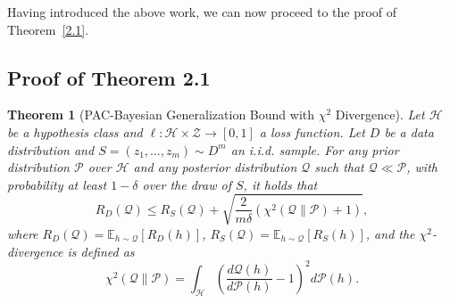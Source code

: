 \documentclass{article}
\theoremstyle{plain}
\newtheorem{theorem}{Theorem}[section]
\theoremstyle{definition}
\theoremstyle{remark}
\begin{document}
Having introduced the above work, we can now proceed to the proof of Theorem~\ref{2.1}.

\subsection{Proof of Theorem 2.1} \label{T2.1}
\begin{theorem}[PAC-Bayesian Generalization Bound with $\chi^2$ Divergence]
Let $\mathcal{H}$ be a hypothesis class and $\ell: \mathcal{H} \times \mathcal{Z} \to [0,1]$ a loss function. Let $D$ be a data distribution and $S = (z_1, \dots, z_m) \sim D^m$ an i.i.d. sample. For any prior distribution $\mathcal{P}$ over $\mathcal{H}$ and any posterior distribution $\mathcal{Q}$ such that $\mathcal{Q} \ll \mathcal{P}$, with probability at least $1 - \delta$ over the draw of $S$, it holds that
\begin{equation}
    R_D(\mathcal{Q}) \leq R_S(\mathcal{Q}) + \sqrt{ \frac{2}{m\delta} \left( \chi^2(\mathcal{Q} \| \mathcal{P}) + 1 \right)  },
\end{equation}
where $R_D(\mathcal{Q}) = \mathbb{E}_{h \sim \mathcal{Q}}[R_D(h)]$, $R_S(\mathcal{Q}) = \mathbb{E}_{h \sim \mathcal{Q}}[R_S(h)]$, and the $\chi^2$-divergence is defined as
\begin{equation}
    \chi^2(\mathcal{Q} \| \mathcal{P}) = \int_{\mathcal{H}} \left( \frac{d\mathcal{Q}(h)}{d\mathcal{P}(h)} - 1 \right)^2 d\mathcal{P}(h).
\end{equation}
\end{theorem}
\end{document}
